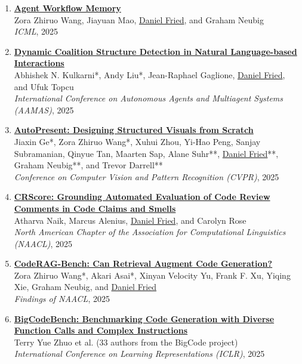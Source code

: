 \begin{enumerate}[leftmargin=-1mm,partopsep=0pt]
\item \href{https://arxiv.org/abs/2409.07429}{\textbf{Agent Workflow Memory}} \\
  Zora Zhiruo Wang, Jiayuan Mao, \underline{Daniel Fried}, and Graham Neubig\\
  \emph{ICML}, 2025

\item \href{https://arxiv.org/abs/2502.16339}{\textbf{Dynamic Coalition Structure Detection in Natural Language-based Interactions}} \\
  Abhishek N. Kulkarni*, Andy Liu*, Jean-Raphael Gaglione, \underline{Daniel Fried}, and Ufuk Topcu\\
  \emph{International Conference on Autonomous Agents and Multiagent Systems (AAMAS)}, 2025

\item \href{https://arxiv.org/abs/2501.00912}{\textbf{AutoPresent: Designing Structured Visuals from Scratch}} \\
  Jiaxin Ge*, Zora Zhiruo Wang*, Xuhui Zhou, Yi-Hao Peng, Sanjay Subramanian, Qinyue Tan, Maarten Sap, Alane Suhr**, \underline{Daniel Fried}**, Graham Neubig**, and Trevor Darrell**\\
  \emph{Conference on Computer Vision and Pattern Recognition (CVPR)}, 2025

\item \href{https://arxiv.org/abs/2409.19801}{\textbf{CRScore: Grounding Automated Evaluation of Code Review Comments in Code Claims and Smells}} \\
  Atharva Naik, Marcus Alenius, \underline{Daniel Fried}, and Carolyn Rose\\
  \emph{North American Chapter of the Association for Computational Linguistics (NAACL)}, 2025

\item \href{https://arxiv.org/abs/2406.14497}{\textbf{{CodeRAG-Bench}: Can Retrieval Augment Code Generation?}} \\
  Zora Zhiruo Wang*, Akari Asai*, Xinyan Velocity Yu, Frank F. Xu, Yiqing Xie, Graham Neubig, and \underline{Daniel Fried}\\
  \emph{Findings of NAACL}, 2025

\item \href{https://arxiv.org/abs/2406.15877}{\textbf{{BigCodeBench}: Benchmarking Code Generation with Diverse Function Calls and Complex Instructions}} \\
  Terry Yue Zhuo et al. (33 authors from the BigCode project)\\
  \emph{International Conference on Learning Representations (ICLR)}, 2025


\end{enumerate}
